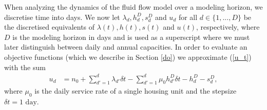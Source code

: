 \documentclass[12pt,a4paper]{article}
\begin{document}
When analyzing the dynamics of the fluid flow model over a modeling horizon, we discretise time into days. We now let $\lambda_d, h^D_d, s^D_d$ and $u_d$ for all $d \in \{1,...,D\}$ be the discretised equivalents of $\lambda(t), h(t), s(t)$ and $u(t)$, respectively, where $D$ is the modeling horizon in days and is used as a superscript where we must later distinguish between daily and annual capacities. In order to evaluate an objective functions (which we describe in Section \ref{do}) we approximate (\ref{u_t}) with the sum 
%
\begin{align} \label{u_t_discrete}
u_d & = n_0 + \sum_{d'=1}^{d} \lambda_{d'} \delta t - \sum_{d'=1}^{d} \mu_0 h^D_{d'} \delta t - h^D_d - s^D_d, 
\end{align}
%
where $\mu_0$ is the daily service rate of a single housing unit and the stepsize $\delta t = 1 \text{ day}$.
\end{document}
